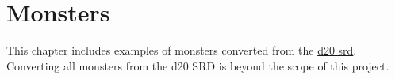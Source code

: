 \section{Monsters}
This chapter includes examples of monsters converted from the \href{http://www.wizards.com/default.asp?x=d20/article/srd35}{d20 srd}.
Converting all monsters from the d20 SRD is beyond the scope of this project.




